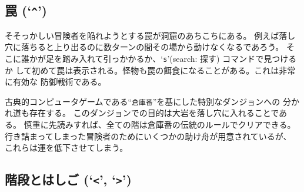 \subsection*{罠 (`{\tt \^{}}')}

そそっかしい冒険者を陥れようとする罠が洞窟のあちこちにある。
例えば落し穴に落ちると上り出るのに数ターンの間その場から動けなくなるであろう。
そこに誰かが足を踏み入れて引っかかるか、`{\tt s}'(search: 探す) コマンドで見つけるか
して初めて罠は表示される。怪物も罠の餌食になることがある。これは非常に有効な
防御戦術である。

古典的コンピュータゲームである``{\tt 倉庫番}''を基にした特別なダンジョンへの
分かれ道も存在する。
このダンジョンでの目的は大岩を落し穴に入れることである。
慎重に先読みすれば、全ての階は倉庫番の伝統のルールでクリアできる。
行き詰まってしまった冒険者のためにいくつかの助け舟が用意されているが、
これらは運を低下させてしまう。

\subsection*{階段とはしご (`{\tt <}', `{\tt >}')}

